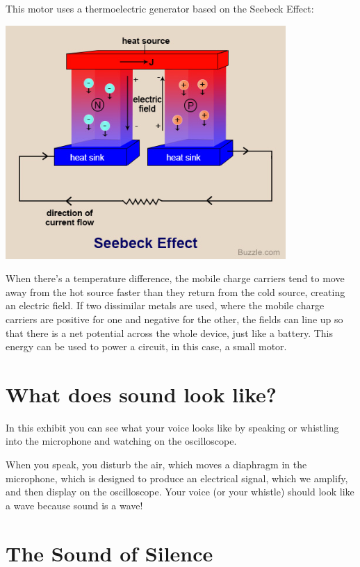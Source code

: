 \documentclass[12pt]{article}
\begin{document}
\noindent
This motor uses a thermoelectric generator based on the Seebeck Effect:
\begin{center}
{\includegraphics[width=0.80\textwidth]{figs/seebeck.jpg}}
\end{center}
When there's a temperature difference, the mobile charge carriers tend to move away from the hot source faster than they return from the cold source, creating an electric field.  If two dissimilar metals are used, where the mobile charge carriers are positive for one and negative for the other, the fields can line up so that there is a net potential across the whole device, just like a battery.  This energy can be used to power a circuit, in this case, a small motor.

\newpage

\section{What does sound look like?}

In this exhibit you can see what your voice looks like by speaking or whistling into the microphone and watching on the oscilloscope.   \\ \vskip 0.5cm

\noindent
When you speak, you disturb the air, which moves a diaphragm in the microphone, which is designed to produce an electrical signal, which we amplify, and then display on the oscilloscope.  Your voice (or your whistle) should look like a wave because sound is a wave!

\newpage

\section{The Sound of Silence}
\end{document}
